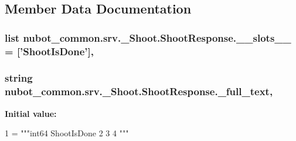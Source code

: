\subsection{Member Data Documentation}
\hypertarget{classnubot__common_1_1srv_1_1__Shoot_1_1ShootResponse_ae0dc076f7ec32b740d3f9137ba38e3c7}{
\subsubsection[{\-\_\-\-\_\-slots\-\_\-\-\_\-}]{\setlength{\rightskip}{0pt plus 5cm}list nubot\-\_\-common.\-srv.\-\_\-\-Shoot.\-Shoot\-Response.\-\_\-\-\_\-slots\-\_\-\-\_\- = \mbox{[}'{\bf Shoot\-Is\-Done}'\mbox{]}\hspace{0.3cm}{\ttfamily [static]}, {\ttfamily [private]}}}\label{classnubot__common_1_1srv_1_1__Shoot_1_1ShootResponse_ae0dc076f7ec32b740d3f9137ba38e3c7}
\hypertarget{classnubot__common_1_1srv_1_1__Shoot_1_1ShootResponse_ad08a69928f6301cfe2b7b7e8055f1e87}{
\subsubsection[{\-\_\-full\-\_\-text}]{\setlength{\rightskip}{0pt plus 5cm}string nubot\-\_\-common.\-srv.\-\_\-\-Shoot.\-Shoot\-Response.\-\_\-full\-\_\-text\hspace{0.3cm}{\ttfamily [static]}, {\ttfamily [private]}}}\label{classnubot__common_1_1srv_1_1__Shoot_1_1ShootResponse_ad08a69928f6301cfe2b7b7e8055f1e87}
{\bfseries Initial value\-:}
\begin{DoxyCode}
1 = \textcolor{stringliteral}{"""int64 ShootIsDone}
2 \textcolor{stringliteral}{}
3 \textcolor{stringliteral}{}
4 \textcolor{stringliteral}{"""}
\end{DoxyCode}
